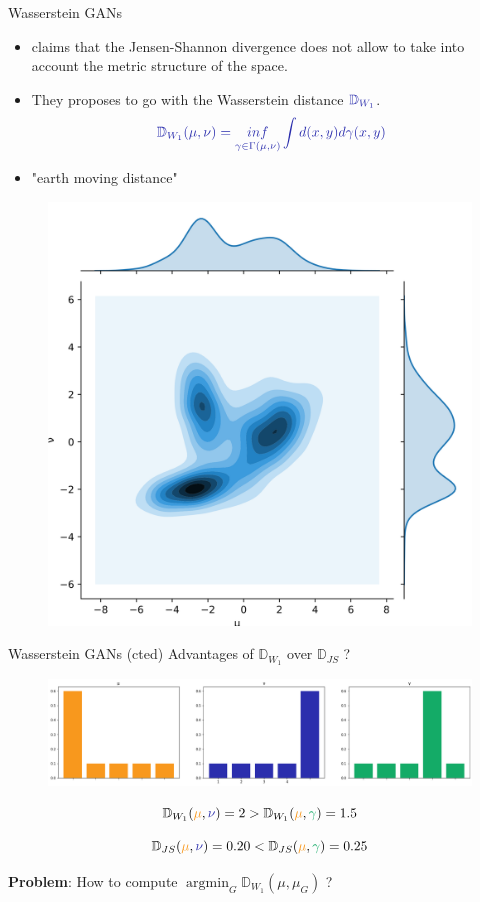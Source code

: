 \documentclass{beamer}
\begin{document}
\begin{frame}{Wasserstein GANs}
\begin{itemize}
    \item \cite{wgan} claims that the Jensen-Shannon divergence does not allow to take into account the metric structure of the space.
    \item They proposes to go with the Wasserstein distance $\textcolor{cBlue}{\mathbb{D}_{W_1}}$.
    \[ \textcolor{cBlue}{\mathbb{D}_{W_1}(\mu, \nu) = \mathop{inf}_{\gamma \in \Gamma(\mu, \nu)} \int d(x,y) d\gamma(x,y)} \]
    \item "earth moving distance"
\end{itemize}
\begin{figure}
    \centering
    \includegraphics[width=0.35\linewidth]{images/wasserstein.png}
\end{figure}
\end{frame}

\begin{frame}{Wasserstein GANs (cted)}
Advantages of $\mathbb{D}_{W_1}$ over $ \mathbb{D}_{JS}$ ?

\begin{figure}
    \centering
    \includegraphics[width=0.95\linewidth]{images/distrib.png}
\end{figure}

\[ \mathbb{D}_{W_1}(\textcolor{cOrange}{\mu}, \textcolor{cBlue}{\nu}) = 2 > \mathbb{D}_{W_1}(\textcolor{cOrange}{\mu}, \textcolor{cGreen}{\gamma}) = 1.5 \]

\[ \mathbb{D}_{JS}(\textcolor{cOrange}{\mu}, \textcolor{cBlue}{\nu}) = 0.20 < \mathbb{D}_{JS}(\textcolor{cOrange}{\mu}, \textcolor{cGreen}{\gamma}) = 0.25 \]

\begin{center}
    \textcolor{cRed}{\textbf{Problem}: How to compute $\mathop{argmin}_G \mathbb{D}_{W_1}(\mu, \mu_G)$ ?}
\end{center}
\end{frame}
\end{document}
